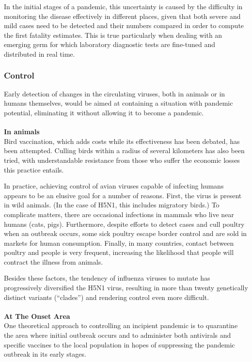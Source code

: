 \documentclass[12pt, a4]{scrartcl}
\begin{document}
In the initial stages of a pandemic, this uncertainty is caused by the difficulty in monitoring the disease effectively in different places, given that both severe and mild cases need to be detected and their numbers compared in order to compute the first fatality estimates. This is true particularly when dealing with an emerging germ for which laboratory diagnostic tests are fine-tuned and distributed in real time.

\subsubsection {Control}
Early detection of changes in the circulating viruses, both in animals or in humans themselves, would be aimed at containing a situation with pandemic potential, eliminating it without allowing it to become a pandemic.
\\
\\
\textbf{In animals}\\
Bird vaccination, which adds costs while its effectiveness has been debated, has been attempted. Culling birds within a radius of several kilometers has also been tried, with understandable resistance from those who suffer the economic losses this practice entails.

In practice, achieving control of avian viruses capable of infecting humans appears to be an elusive goal for a number of reasons. First, the virus is present in wild animals. (In the case of H5N1, this includes migratory birds.) To complicate matters, there are occasional infections in mammals who live near humans (cats, pigs). Furthermore, despite efforts to detect cases and cull poultry when an outbreak occurs, some sick poultry escape border control and are sold in markets for human consumption. Finally, in many countries, contact between poultry and people is very frequent, increasing the likelihood that people will contract the illness from animals.

Besides these factors, the tendency of influenza viruses to mutate has progressively diversified the H5N1 virus, resulting in more than twenty genetically distinct variants (“clades”) and rendering control even more difficult.
\\
\\
\textbf{At The Onset Area}\\
One theoretical approach to controlling an incipient pandemic is to quarantine the area where initial outbreak occurs and to administer both antivirals and specific vaccines to the local population in hopes of suppressing the pandemic outbreak in its early stages.
\end{document}
